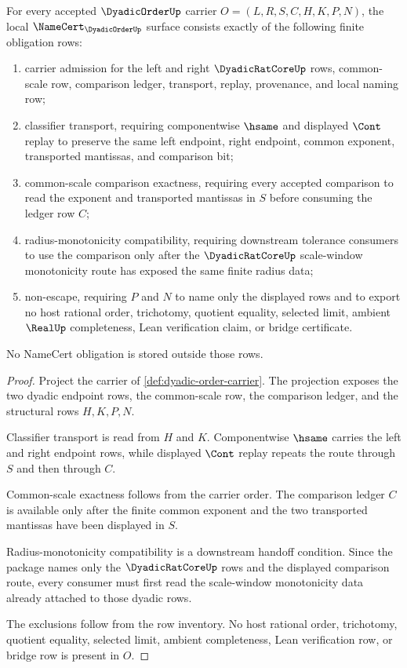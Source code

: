 \begin{theorem}
\label{thm:dyadic-order-namecert-obligations}
For every accepted $\DyadicOrderUp$ carrier $O=(L,R,S,C,H,K,P,N)$, the local $\NameCert_{\DyadicOrderUp}$ surface consists exactly of the following finite obligation rows:
\begin{enumerate}
\item carrier admission for the left and right $\DyadicRatCoreUp$ rows, common-scale row, comparison ledger, transport, replay, provenance, and local naming row;
\item classifier transport, requiring componentwise $\hsame$ and displayed $\Cont$ replay to preserve the same left endpoint, right endpoint, common exponent, transported mantissas, and comparison bit;
\item common-scale comparison exactness, requiring every accepted comparison to read the exponent and transported mantissas in $S$ before consuming the ledger row $C$;
\item radius-monotonicity compatibility, requiring downstream tolerance consumers to use the comparison only after the $\DyadicRatCoreUp$ scale-window monotonicity route has exposed the same finite radius data;
\item non-escape, requiring $P$ and $N$ to name only the displayed rows and to export no host rational order, trichotomy, quotient equality, selected limit, ambient $\RealUp$ completeness, Lean verification claim, or bridge certificate.
\end{enumerate}
No NameCert obligation is stored outside those rows.
\end{theorem}
\begin{proof}
Project the carrier of \autoref{def:dyadic-order-carrier}. The projection exposes the two dyadic endpoint rows, the common-scale row, the comparison ledger, and the structural rows $H,K,P,N$.

Classifier transport is read from $H$ and $K$. Componentwise $\hsame$ carries the left and right endpoint rows, while displayed $\Cont$ replay repeats the route through $S$ and then through $C$.

Common-scale exactness follows from the carrier order. The comparison ledger $C$ is available only after the finite common exponent and the two transported mantissas have been displayed in $S$.

Radius-monotonicity compatibility is a downstream handoff condition. Since the package names only the $\DyadicRatCoreUp$ rows and the displayed comparison route, every consumer must first read the scale-window monotonicity data already attached to those dyadic rows.

The exclusions follow from the row inventory. No host rational order, trichotomy, quotient equality, selected limit, ambient completeness, Lean verification row, or bridge row is present in $O$.
\end{proof}

